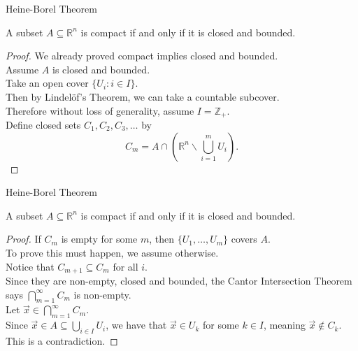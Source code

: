\documentclass{beamer}
\begin{document}
\begin{frame}{Heine-Borel Theorem}
\begin{thm}
A subset $A\subseteq\mathbb{R}^n$ is compact if and only if it is closed and bounded.
\end{thm}
\pause
\begin{proof}
\pause
We already proved compact implies closed and bounded.\\
\pause
Assume $A$ is closed and bounded.\\
\pause
Take an open cover $\{U_i: i\in I\}$.\\
\pause
Then by Lindel\"{o}f's Theorem, we can take a countable subcover.\\
\pause
Therefore without loss of generality, assume $I=\mathbb{Z}_+$.\\
\pause
Define closed sets $C_1,C_2,C_3,\dots$ by
\pause
$$C_m = A\cap \left(\mathbb{R}^n\backslash \bigcup_{i=1}^m U_i\right).$$
\end{proof}
\end{frame}

\begin{frame}{Heine-Borel Theorem}
\begin{thm}
A subset $A\subseteq\mathbb{R}^n$ is compact if and only if it is closed and bounded.
\end{thm}
\begin{proof}
\pause
If $C_m$ is empty for some $m$, then $\{U_1,\dots, U_m\}$ covers $A$.\\
\pause
To prove this must happen, we assume otherwise.\\
\pause
Notice that $C_{m+1}\subseteq C_m$ for all $i$.\\
\pause
Since they are non-empty, closed and bounded, the Cantor Intersection Theorem says $\bigcap_{m=1}^\infty C_m$ is non-empty.\\
\pause
Let $\vec x\in \bigcap_{m=1}^\infty C_m$.\\
\pause
Since $\vec x\in A\subseteq \bigcup_{i\in I} U_i$, we have that $\vec x\in U_k$ for some $k\in I$, meaning $\vec x\notin C_k$.\\
\pause
This is a contradiction.
\end{proof}
\end{frame}
\end{document}
